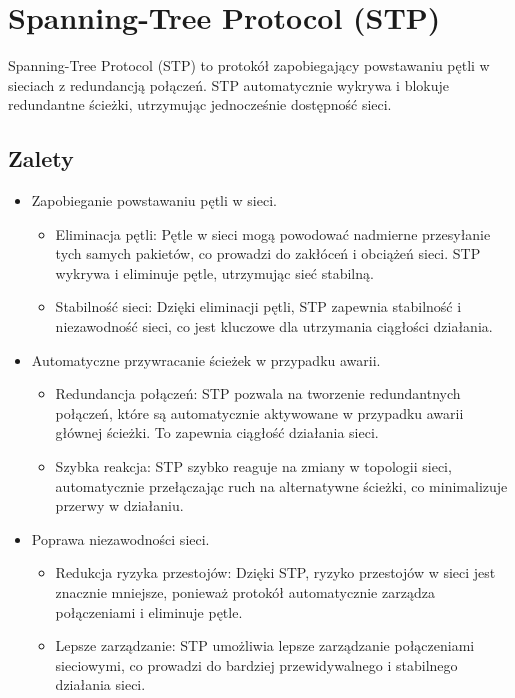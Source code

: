 \newpage

\section{Spanning-Tree Protocol (STP)}

Spanning-Tree Protocol (STP) to protokół zapobiegający powstawaniu pętli w sieciach z redundancją połączeń. STP automatycznie wykrywa i blokuje redundantne ścieżki, utrzymując jednocześnie dostępność sieci.

\subsection{Zalety}
\begin{itemize}
    \item Zapobieganie powstawaniu pętli w sieci.
    \begin{itemize}
        \item Eliminacja pętli: Pętle w sieci mogą powodować nadmierne przesyłanie tych samych pakietów, co prowadzi do zakłóceń i obciążeń sieci. STP wykrywa i eliminuje pętle, utrzymując sieć stabilną.
        \item Stabilność sieci: Dzięki eliminacji pętli, STP zapewnia stabilność i niezawodność sieci, co jest kluczowe dla utrzymania ciągłości działania.
    \end{itemize}
    \item Automatyczne przywracanie ścieżek w przypadku awarii.
    \begin{itemize}
        \item Redundancja połączeń: STP pozwala na tworzenie redundantnych połączeń, które są automatycznie aktywowane w przypadku awarii głównej ścieżki. To zapewnia ciągłość działania sieci.
        \item Szybka reakcja: STP szybko reaguje na zmiany w topologii sieci, automatycznie przełączając ruch na alternatywne ścieżki, co minimalizuje przerwy w działaniu.
    \end{itemize}
    \item Poprawa niezawodności sieci.
    \begin{itemize}
        \item Redukcja ryzyka przestojów: Dzięki STP, ryzyko przestojów w sieci jest znacznie mniejsze, ponieważ protokół automatycznie zarządza połączeniami i eliminuje pętle.
        \item Lepsze zarządzanie: STP umożliwia lepsze zarządzanie połączeniami sieciowymi, co prowadzi do bardziej przewidywalnego i stabilnego działania sieci.
    \end{itemize}
\end{itemize}

